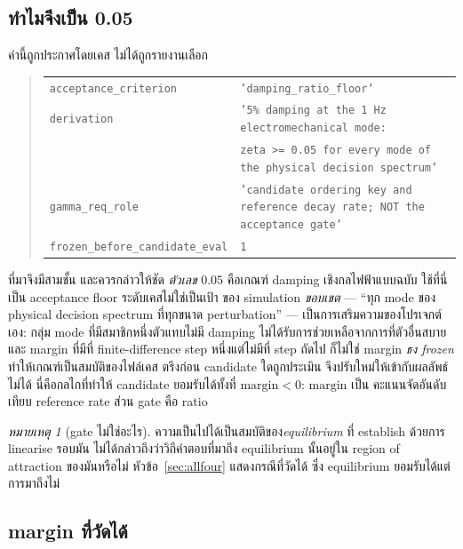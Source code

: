\documentclass[12pt,a4paper]{article}
\theoremstyle{remark}
\newtheorem{remark}{หมายเหตุ}
\newcommand{\code}[1]{\texttt{\small #1}}
\begin{document}
\subsection{ทำไมจึงเป็น 0.05}

ค่านี้ถูกประกาศโดยเคส ไม่ได้ถูกรายงานเลือก

\begin{quote}\small
\begin{tabular}{@{}ll@{}}
\code{acceptance\_criterion} & \code{'damping\_ratio\_floor'}\\
\code{derivation} & \code{'5\% damping at the 1\,Hz electromechanical mode:}\\
                 & \code{zeta >= 0.05 for every mode of the physical decision spectrum'}\\
\code{gamma\_req\_role} & \code{'candidate ordering key and reference decay rate; NOT the acceptance gate'}\\
\code{frozen\_before\_candidate\_eval} & \code{1}\\
\end{tabular}
\end{quote}

ที่มาจึงมีสามชั้น และควรกล่าวให้ชัด \emph{ตัวเลข} $0.05$ คือเกณฑ์ damping
เชิงกลไฟฟ้าแบบฉบับ ใช้ที่นี่เป็น acceptance floor ระดับเคสไม่ใช่เป็นเป้า
ของ simulation \emph{ขอบเขต} --- ``ทุก mode ของ physical decision spectrum
ที่ทุกขนาด perturbation'' --- เป็นการเสริมความของโปรเจกต์เอง: กลุ่ม mode
ที่มีสมาชิกหนึ่งตัวแทบไม่มี damping ไม่ได้รับการช่วยเหลือจากการที่ตัวอื่นสบาย
และ margin ที่มีที่ finite-difference step หนึ่งแต่ไม่มีที่ step ถัดไป
ก็ไม่ใช่ margin \emph{ธง frozen} ทำให้เกณฑ์เป็นสมบัติของไฟล์เคส ตรึงก่อน
candidate ใดถูกประเมิน จึงปรับใหม่ให้เข้ากับผลลัพธ์ไม่ได้ นี่คือกลไกที่ทำให้
candidate ยอมรับได้ทั้งที่ $\mathrm{margin} < 0$: $\mathrm{margin}$ เป็น
คะแนนจัดอันดับเทียบ reference rate ส่วน gate คือ ratio

\begin{remark}[gate ไม่ใช่อะไร]
ความเป็นไปได้เป็นสมบัติของ\emph{equilibrium} ที่ establish ด้วยการ linearise
รอบมัน ไม่ได้กล่าวถึงว่าวิถีคำตอบที่มาถึง equilibrium นั้นอยู่ใน
region of attraction ของมันหรือไม่ หัวข้อ~\ref{sec:allfour} แสดงกรณีที่วัดได้
ซึ่ง equilibrium ยอมรับได้แต่การมาถึงไม่
\end{remark}

\subsection{margin ที่วัดได้}
\end{document}
